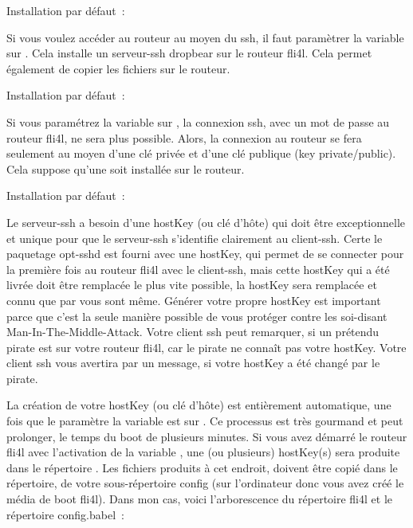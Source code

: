 \begin{description}


  Installation par défaut~: 

  Si vous voulez accéder au routeur au moyen du ssh, il faut paramètrer la
  variable  sur . Cela installe un serveur-ssh
  dropbear sur le routeur fli4l. Cela permet également de copier les fichiers
  sur le routeur.


  Installation par défaut~: 

  Si vous paramétrez la variable  sur ,
  la connexion ssh, avec un mot de passe au routeur fli4l, ne sera plus
  possible. Alors, la connexion au routeur se fera seulement au moyen
  d'une clé privée et d'une clé publique (key private/public). Cela suppose qu'une
   soit installée sur le routeur.


  Installation par défaut~: 

  Le serveur-ssh a besoin d'une hostKey (ou clé d'hôte) qui doit être exceptionnelle
  et unique pour que le serveur-ssh s'identifie clairement au client-ssh. Certe
  le paquetage opt-sshd est fourni avec une hostKey, qui permet de se connecter pour
  la première fois au routeur fli4l avec le client-ssh, mais cette hostKey qui a
  été livrée doit être remplacée le plus vite possible, la hostKey sera remplacée
  et connu que par vous sont même. 
  Générer votre propre hostKey est important parce que c'est la seule manière
  possible de vous protéger contre les soi-disant Man-In-The-Middle-Attack.
  Votre client ssh peut remarquer, si un prétendu pirate est sur votre routeur
  fli4l, car le pirate ne connaît pas votre hostKey. Votre client ssh vous
  avertira par un message, si votre hostKey a été changé par le pirate.
 
  La création de votre hostKey (ou clé d'hôte) est entièrement automatique, une
  fois que le paramètre la variable  est sur .
  Ce processus est très gourmand et peut prolonger, le temps du boot de plusieurs
  minutes. Si vous avez démarré le routeur fli4l avec l'activation de la variable
  , une (ou plusieurs) hostKey(s) sera produite dans
  le répertoire . Les fichiers produits à cet endroit, doivent
  être copié dans le répertoire,  de votre sous-répertoire config
  (sur l'ordinateur donc vous avez créé le média de boot fli4l). Dans mon cas,
  voici l'arborescence du répertoire fli4l et le répertoire config.babel~:


\end{description}
